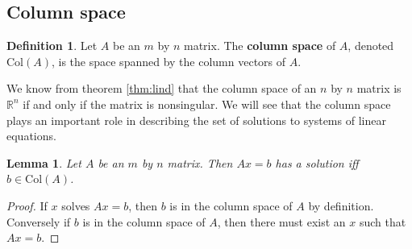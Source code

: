 \documentclass[12pt,reqno]{amsart}
\newtheorem{lemma}{Lemma}[section]
\theoremstyle{definition}
\newtheorem{definition}{Definition}[section]
\def\R{\mathbb{R}}
\newcommand{\col}{\mathrm{Col}}
\begin{document}
\subsection{Column space}

\begin{definition}
  Let $A$ be an $m$ by $n$ matrix. The \textbf{column space} of $A$,
  denoted $\col(A)$, is the space spanned by the column vectors of
  $A$.
\end{definition}
We know from theorem \ref{thm:lind} that the column space of an $n$ by
$n$ matrix is $\R^n$ if and only if the matrix is nonsingular. We will
see that the column space plays an important role in describing the
set of solutions to systems of linear equations. 
\begin{lemma}
  Let $A$ be an $m$ by $n$ matrix. Then $A x = b$ has a solution iff $b
  \in \col(A)$.
\end{lemma}
\begin{proof}
  If $x$ solves $Ax = b$, then $b$ is in the column space of $A$ by
  definition. Conversely if $b$ is in the column space of $A$, then
  there must exist an $x$ such that $A x=  b$.
\end{proof}
\end{document}
